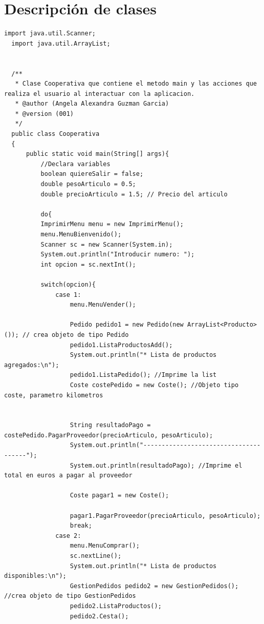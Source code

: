 \documentclass[10pt,a4paper]{article}
\def\StartLineAt#1{\lstset{firstnumber=#1}}
\begin{document}

\section{Descripción de clases}

\StartLineAt{1}
\begin{lstlisting}[style=Java]
  import java.util.Scanner;
  import java.util.ArrayList;
  
  
  /**
   * Clase Cooperativa que contiene el metodo main y las acciones que realiza el usuario al interactuar con la aplicacion.
   * @author (Angela Alexandra Guzman Garcia) 
   * @version (001)
   */
  public class Cooperativa
  {
      public static void main(String[] args){
          //Declara variables
          boolean quiereSalir = false;
          double pesoArticulo = 0.5;
          double precioArticulo = 1.5; // Precio del articulo 
      
          do{
          ImprimirMenu menu = new ImprimirMenu();
          menu.MenuBienvenido();
          Scanner sc = new Scanner(System.in);
          System.out.println("Introducir numero: ");
          int opcion = sc.nextInt();
          
          switch(opcion){
              case 1:
                  menu.MenuVender();
                  
                  Pedido pedido1 = new Pedido(new ArrayList<Producto>()); // crea objeto de tipo Pedido
                  pedido1.ListaProductosAdd();
                  System.out.println("* Lista de productos agregados:\n");
                  pedido1.ListaPedido(); //Imprime la list
                  Coste costePedido = new Coste(); //Objeto tipo coste, parametro kilometros
                  
                  
                  String resultadoPago = costePedido.PagarProveedor(precioArticulo, pesoArticulo);
                  System.out.println("--------------------------------------");
                  System.out.println(resultadoPago); //Imprime el total en euros a pagar al proveedor
  
                  Coste pagar1 = new Coste();
                 
                  pagar1.PagarProveedor(precioArticulo, pesoArticulo);
                  break;
              case 2:
                  menu.MenuComprar();
                  sc.nextLine();
                  System.out.println("* Lista de productos disponibles:\n");
                  GestionPedidos pedido2 = new GestionPedidos(); //crea objeto de tipo GestionPedidos
                  pedido2.ListaProductos();
                  pedido2.Cesta();
                  

\end{lstlisting}
\end{document}
